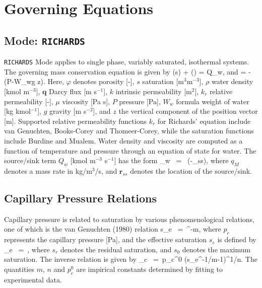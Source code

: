 \documentclass[12pt]{article}
\def\EQ#1\EN{\begin{equation}#1\end{equation}}
\newcommand{\eq}{\ =\ }
\newcommand{\p}{{\partial}}
\newcommand{\bnabla}{\boldsymbol{\nabla}}
\newcommand{\bq}{\boldsymbol{q}}
\newcommand{\br}{\boldsymbol{r}}
\begin{document}
\section{Governing Equations}

\subsection{Mode: {\tt RICHARDS}}

{\tt RICHARDS} Mode applies to single phase, variably saturated, isothermal systems. The governing mass conservation equation is given by
\EQ
\frac{\p}{\p t}\left(\varphi s\rho\right) + \bnabla\cdot\left(\rho\bq\right) = Q_w,
\EN
and
\EQ
\bq = -\bnabla\left(P-W_w\rho g z\right).
\EN
Here, $\varphi$ denotes porosity [-], 
$s$ saturation [m$^3$m$^{-3}$], 
$\rho$ water density [kmol m$^{-3}$], 
$\bq$ Darcy flux [m s$^{-1}$], 
$k$ intrinsic permeability [m$^2$], 
$k_r$ relative permeability [-], 
$\mu$ viscosity [Pa s], 
$P$ pressure [Pa], 
$W_w$ formula weight of water [kg kmol$^{-1}$], 
$g$ gravity [m s$^{-2}$], and 
$z$ the vertical component of the position vector [m].  
Supported relative permeability functions $k_r$ for Richards' equation include van Genuchten, Books-Corey and Thomeer-Corey, while the saturation functions include Burdine and Mualem.  Water density and viscosity are computed as a function of temperature and pressure through an equation of state for water. The source/sink term $Q_w$ [kmol m$^{-3}$ s$^{-1}$] has the form
\EQ
Q_w \eq {} \delta(\br-\br_{ss}),
\EN
where $q_M$ denotes a mass rate in kg/m$^{3}$/s, and $\br_{ss}$ denotes the location of the source/sink.

\subsection{Capillary Pressure Relations}

Capillary pressure is related to saturation by various 
phenomenological relations, one of which is the van Genuchten 
(1980) relation 
\EQ\label{seff}
s_e \eq {}^{-m}, 
\EN 
where $p_c$ represents the capillary pressure [Pa], and the effective saturation $s_e$ is defined by 
\EQ 
s_e \eq {}, 
\EN 
where $s_r$ denotes the residual saturation, and $s_0$ denotes 
the maximum saturation. 
The inverse relation is given by
\EQ
p_c \eq p_c^0 \left(s_e^{-1/m}-1\right)^{1/n}.
\EN
The quantities $m$, $n$ and $p_c^0$ are impirical constants determined by fitting to experimental data.
\end{document}
